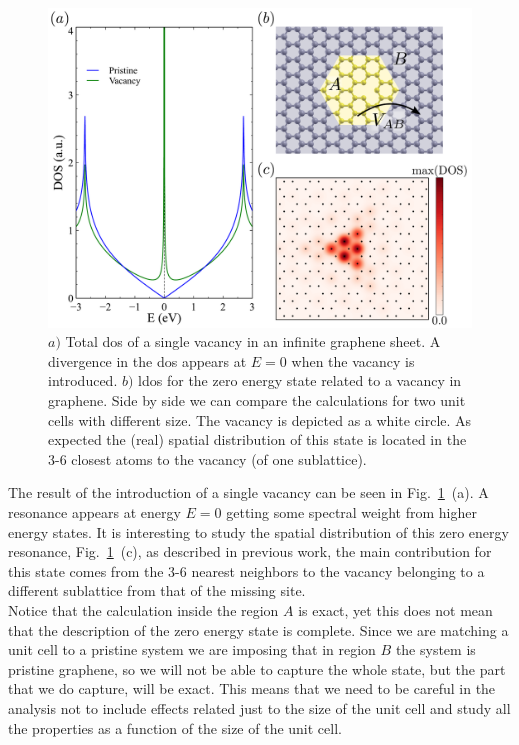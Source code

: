 \begin{figure}[h!]
\centering
\includegraphics{chapter05/figures/DOSlDOS.pdf}
\vspace{-5pt}
\caption{$a)$ Total \ac{dos} of a single vacancy in an infinite graphene sheet. A divergence in the \ac{dos} appears at $E=0$ when the vacancy is introduced. $b)$ \ac{ldos} for the zero energy state related to a vacancy in graphene. Side by side we can compare the calculations for two unit cells with different size. The vacancy is depicted as a white circle. As expected the (real) spatial distribution of this state is located in the 3-6 closest atoms to the vacancy (of one sublattice).}
\label{DOS}
\vspace{-5pt}
\end{figure}

The result of the introduction of a single vacancy can be seen in Fig.~\ref{DOS}~(a). A resonance appears at energy $E=0$ getting some spectral weight from higher energy states.
It is interesting to study the spatial distribution of this zero energy resonance, Fig.~\ref{DOS}~(c), as described in previous work, the main contribution for this state comes from the 3-6 nearest neighbors to the vacancy belonging to a different sublattice from that of the missing site.\\

Notice that the calculation inside the region $A$ is exact, yet this does not mean that the description of the zero energy state is complete. Since we are matching a unit cell to a pristine system we are imposing that in region $B$ the system is pristine graphene, so we will not be able to capture the whole state, but the part that we do capture, will be exact.
This means that we need to be careful in the analysis not to include effects related just to the size of the unit cell and study all the properties as a function of the size of the unit cell.





